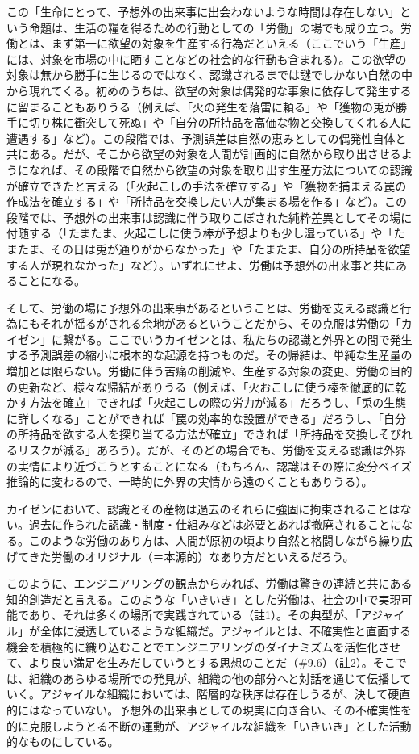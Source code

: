 この「生命にとって、予想外の出来事に出会わないような時間は存在しない」という命題は、生活の糧を得るための行動としての「労働」の場でも成り立つ。労働とは、まず第一に欲望の対象を生産する行為だといえる（ここでいう「生産」には、対象を市場の中に晒すことなどの社会的な行動も含まれる）。この欲望の対象は無から勝手に生じるのではなく、認識されるまでは謎でしかない自然の中から現れてくる。初めのうちは、欲望の対象は偶発的な事象に依存して発生するに留まることもありうる（例えば、「火の発生を落雷に頼る」や「獲物の兎が勝手に切り株に衝突して死ぬ」や「自分の所持品を高価な物と交換してくれる人に遭遇する」など）。この段階では、予測誤差は自然の恵みとしての偶発性自体と共にある。だが、そこから欲望の対象を人間が計画的に自然から取り出させるようになれば、その段階で自然から欲望の対象を取り出す生産方法についての認識が確立できたと言える（「火起こしの手法を確立する」や「獲物を捕まえる罠の作成法を確立する」や「所持品を交換したい人が集まる場を作る」など）。この段階では、予想外の出来事は認識に伴う取りこぼされた純粋差異としてその場に付随する（「たまたま、火起こしに使う棒が予想よりも少し湿っている」や「たまたま、その日は兎が通りがからなかった」や「たまたま、自分の所持品を欲望する人が現れなかった」など）。いずれにせよ、労働は予想外の出来事と共にあることになる。

そして、労働の場に予想外の出来事があるということは、労働を支える認識と行為にもそれが揺るがされる余地があるということだから、その克服は労働の「カイゼン」に繋がる。ここでいうカイゼンとは、私たちの認識と外界との間で発生する予測誤差の縮小に根本的な起源を持つものだ。その帰結は、単純な生産量の増加とは限らない。労働に伴う苦痛の削減や、生産する対象の変更、労働の目的の更新など、様々な帰結がありうる（例えば、「火おこしに使う棒を徹底的に乾かす方法を確立」できれば「火起こしの際の労力が減る」だろうし、「兎の生態に詳しくなる」ことができれば「罠の効率的な設置ができる」だろうし、「自分の所持品を欲する人を探り当てる方法が確立」できれば「所持品を交換しそびれるリスクが減る」あろう）。だが、そのどの場合でも、労働を支える認識は外界の実情により近づこうとすることになる（もちろん、認識はその際に変分ベイズ推論的に変わるので、一時的に外界の実情から遠のくこともありうる）。

カイゼンにおいて、認識とその産物は過去のそれらに強固に拘束されることはない。過去に作られた認識・制度・仕組みなどは必要とあれば撤廃されることになる。このような労働のあり方は、人間が原初の頃より自然と格闘しながら繰り広げてきた労働のオリジナル（＝本源的）なあり方だといえるだろう。

このように、エンジニアリングの観点からみれば、労働は驚きの連続と共にある知的創造だと言える。このような「いきいき」とした労働は、社会の中で実現可能であり、それは多くの場所で実践されている（註1）。その典型が、「アジャイル」が全体に浸透しているような組織だ。アジャイルとは、不確実性と直面する機会を積極的に織り込むことでエンジニアリングのダイナミズムを活性化させて、より良い満足を生みだしていうとする思想のことだ（\#9.6）（註2）。そこでは、組織のあらゆる場所での発見が、組織の他の部分へと対話を通じて伝播していく。アジャイルな組織においては、階層的な秩序は存在しうるが、決して硬直的にはなっていない。予想外の出来事としての現実に向き合い、その不確実性を的に克服しようとる不断の運動が、アジャイルな組織を「いきいき」とした活動的なものにしている。

